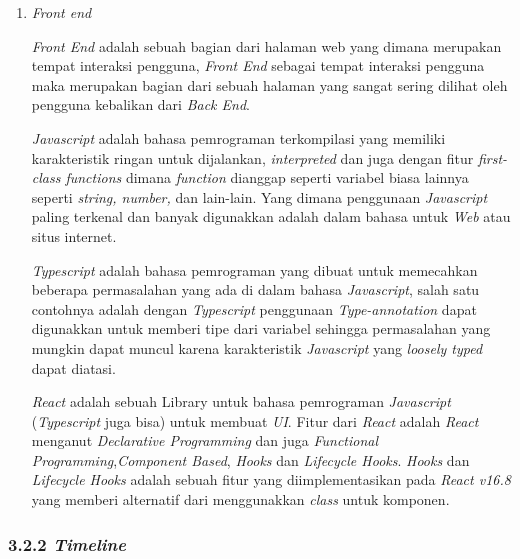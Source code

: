 \documentclass[a4paper]{article}
\begin{document}
\begin{enumerate}[label=\alph*. ]
\begin{enumerate}
              \item \textit{Front end}

                    \textit{Front End} adalah sebuah bagian dari halaman web yang dimana merupakan tempat interaksi pengguna, \textit{Front End} sebagai tempat interaksi pengguna maka merupakan bagian dari sebuah halaman yang sangat sering dilihat oleh pengguna kebalikan dari \textit{Back End}\autocite{codecademy-frontend}.

                    \textit{Javascript} adalah bahasa pemrograman terkompilasi yang memiliki karakteristik ringan untuk dijalankan, \textit{interpreted} dan juga dengan fitur \textit{first-class functions} dimana \textit{function} dianggap seperti variabel biasa lainnya seperti \textit{string, number,} dan lain-lain. Yang dimana penggunaan \textit{Javascript} paling terkenal dan banyak digunakkan adalah dalam bahasa untuk \textit{Web} atau situs internet\autocite{javascript-mdn}.

                    \textit{Typescript} adalah bahasa pemrograman yang dibuat untuk memecahkan beberapa permasalahan yang ada di dalam bahasa \textit{Javascript}, salah satu contohnya adalah dengan \textit{Typescript} penggunaan \textit{Type-annotation} dapat digunakkan untuk memberi tipe dari variabel sehingga permasalahan yang mungkin dapat muncul karena karakteristik \textit{Javascript} yang \textit{loosely typed} dapat diatasi\autocite{fenton2014pro}.

                    \textit{React} adalah sebuah Library untuk bahasa pemrograman \textit{Javascript} (\textit{Typescript} juga bisa) untuk membuat \textit{UI}. Fitur dari \textit{React} adalah \textit{React} menganut \textit{Declarative Programming} dan juga \textit{Functional Programming},\textit{Component Based}, \textit{Hooks} dan \textit{Lifecycle Hooks}\autocite{react-general}. \textit{Hooks} dan \textit{Lifecycle Hooks} adalah sebuah fitur yang diimplementasikan pada \textit{React v16.8} yang memberi alternatif dari menggunakkan \textit{class} untuk komponen\autocite{react-hooks, react-hooks-lifecycle}.

          \end{enumerate}

\end{enumerate}


\newpage
\subsubsection*{3.2.2 \textit{Timeline}}
\end{document}
